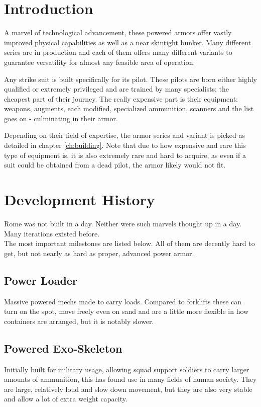 \documentclass[12pt,a4paper,openany,usenames,dvipsnames]{book}
\begin{document}
	

	\chapter{Introduction}
	A marvel of technological advancement, these powered armors offer vastly improved physical capabilities as well as a near skintight bunker. Many different series are in production and each of them offers many different variants to guarantee versatility for almost any feasible area of operation.\par
	Any strike suit is built specifically for its pilot. These pilots are born either highly qualified or extremely privileged and are trained by many specialists; the cheapest part of their journey. The really expensive part is their equipment: weapons, augments, each modified, specialized ammunition, scanners and the list goes on - culminating in their armor.\par
	Depending on their field of expertise, the armor series and variant is picked as detailed in chapter \ref{ch:building}.
	Note that due to how expensive and rare this type of equipment is,
		it is also extremely rare and hard to acquire,
		as even if a suit could be obtained from a dead pilot,
		the armor likely would not fit.
	
	\chapter{Development History}
	Rome was not built in a day. Neither were such marvels thought up in a day. Many iterations existed before.
	\\%
	The most important milestones are listed below. All of them are decently hard to get, but not nearly as hard as proper, advanced power armor.
	\section{Power Loader}
	Massive powered mechs made to carry loads. Compared to forklifts these can turn on the spot, move freely even on sand and are a little more flexible in how containers are arranged, but it is notably slower.
	\par
	\section{Powered Exo-Skeleton}
	Initially built for military usage, allowing squad support soldiers to carry larger amounts of ammunition, this has found use in many fields of human society. They are large, relatively loud and slow down movement, but they are also very stable and allow a lot of extra weight capacity.
	\par
\end{document}
